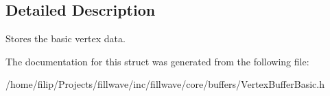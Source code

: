 \subsection{Detailed Description}
Stores the basic vertex data. 

The documentation for this struct was generated from the following file\+:\begin{DoxyCompactItemize}
\item 
/home/filip/\+Projects/fillwave/inc/fillwave/core/buffers/Vertex\+Buffer\+Basic.\+h\end{DoxyCompactItemize}
